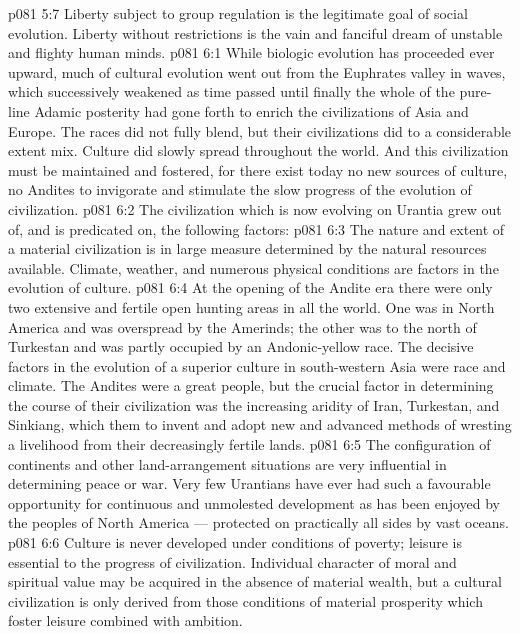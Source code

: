 \vs p081 5:7 Liberty subject to group regulation is the legitimate goal of social evolution. Liberty without restrictions is the vain and fanciful dream of unstable and flighty human minds.
\vs p081 6:1 While biologic evolution has proceeded ever upward, much of cultural evolution went out from the Euphrates valley in waves, which successively weakened as time passed until finally the whole of the pure\hyp{}line Adamic posterity had gone forth to enrich the civilizations of Asia and Europe. The races did not fully blend, but their civilizations did to a considerable extent mix. Culture did slowly spread throughout the world. And this civilization must be maintained and fostered, for there exist today no new sources of culture, no Andites to invigorate and stimulate the slow progress of the evolution of civilization.
\vs p081 6:2 \pc The civilization which is now evolving on Urantia grew out of, and is predicated on, the following factors:
\vs p081 6:3 \bibnobreakspace {} The nature and extent of a material civilization is in large measure determined by the natural resources available. Climate, weather, and numerous physical conditions are factors in the evolution of culture.
\vs p081 6:4 At the opening of the Andite era there were only two extensive and fertile open hunting areas in all the world. One was in North America and was overspread by the Amerinds; the other was to the north of Turkestan and was partly occupied by an Andonic\hyp{}yellow race. The decisive factors in the evolution of a superior culture in south\hyp{}western Asia were race and climate. The Andites were a great people, but the crucial factor in determining the course of their civilization was the increasing aridity of Iran, Turkestan, and Sinkiang, which  them to invent and adopt new and advanced methods of wresting a livelihood from their decreasingly fertile lands.
\vs p081 6:5 The configuration of continents and other land\hyp{}arrangement situations are very influential in determining peace or war. Very few Urantians have ever had such a favourable opportunity for continuous and unmolested development as has been enjoyed by the peoples of North America --- protected on practically all sides by vast oceans.
\vs p081 6:6 \bibnobreakspace {} Culture is never developed under conditions of poverty; leisure is essential to the progress of civilization. Individual character of moral and spiritual value may be acquired in the absence of material wealth, but a cultural civilization is only derived from those conditions of material prosperity which foster leisure combined with ambition.
